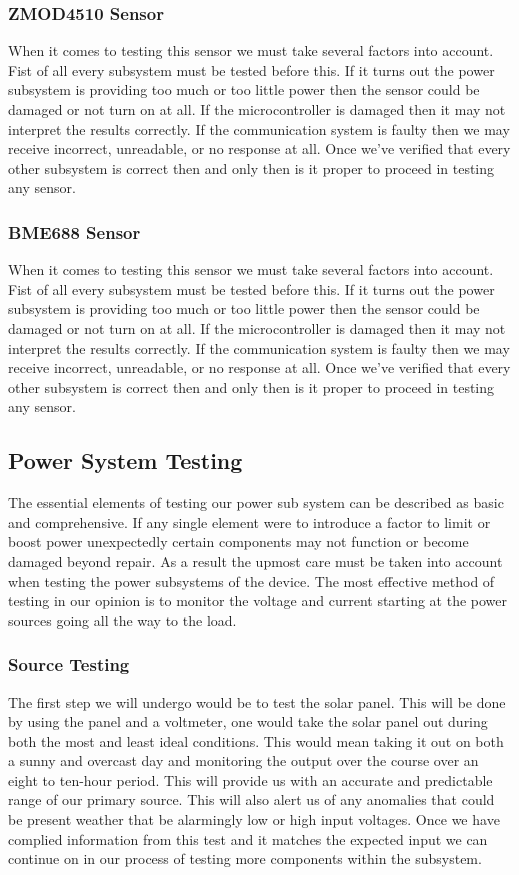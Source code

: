 \subsubsection{ZMOD4510 Sensor}
When it comes to testing this sensor we must take several factors into account. Fist of all every subsystem must be tested before this. If it turns out the power subsystem is providing too much or too little power then the sensor could be damaged or not turn on at all. If the microcontroller is damaged then it may not interpret the results correctly. If the communication system is faulty then we may receive incorrect, unreadable, or no response at all. Once we've verified that every other subsystem is correct then and only then is it proper to proceed in testing any sensor.

\subsubsection{BME688 Sensor}
When it comes to testing this sensor we must take several factors into account. Fist of all every subsystem must be tested before this. If it turns out the power subsystem is providing too much or too little power then the sensor could be damaged or not turn on at all. If the microcontroller is damaged then it may not interpret the results correctly. If the communication system is faulty then we may receive incorrect, unreadable, or no response at all. Once we've verified that every other subsystem is correct then and only then is it proper to proceed in testing any sensor.

\subsection{Power System Testing}
The essential elements of testing our power sub system can be described as basic and comprehensive. If any single element were to introduce a factor to limit or boost power unexpectedly certain components may not function or become damaged beyond repair. As a result the upmost care must be taken into account when testing the power subsystems of the device. The most effective method of testing in our opinion is to monitor the voltage and current starting at the power sources going all the way to the load. 

\subsubsection{Source Testing}
The first step we will undergo would be to test the solar panel. This will be done by using the panel and a voltmeter, one would take the solar panel out during both the most and least ideal conditions. This would mean taking it out on both a sunny and overcast day and monitoring the output over the course over an eight to ten-hour period. This will provide us with an accurate and predictable range of our primary source. This will also alert us of any anomalies that could be present weather that be alarmingly low or high input voltages. Once we have complied information from this test and it matches the expected input we can continue on in our process of testing more components within the subsystem.

